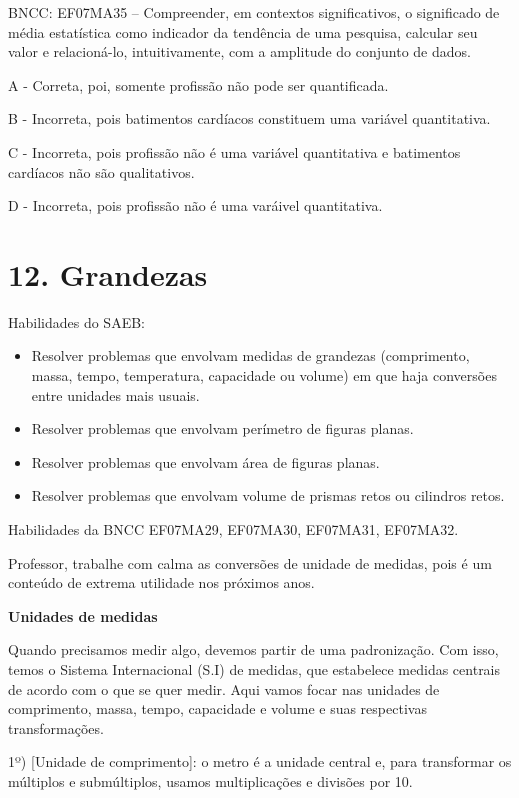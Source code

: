 BNCC: EF07MA35 -- Compreender, em contextos significativos, o
significado de média estatística como indicador da tendência de uma
pesquisa, calcular seu valor e relacioná-lo, intuitivamente, com a
amplitude do conjunto de dados.

A - Correta, poi, somente profissão não pode ser quantificada.

B - Incorreta, pois batimentos cardíacos constituem uma variável
quantitativa.

C - Incorreta, pois profissão não é uma variável quantitativa e
batimentos cardíacos não são qualitativos.

D - Incorreta, pois profissão não é uma varáivel quantitativa.

\hypertarget{grandezas}{%
\section{12. Grandezas}\label{grandezas}}

Habilidades do SAEB:

\begin{itemize}
\item
  Resolver problemas que envolvam medidas de grandezas (comprimento,
  massa, tempo, temperatura, capacidade ou volume) em que haja
  conversões entre unidades mais usuais.
\item
  Resolver problemas que envolvam perímetro de figuras planas.
\item
  Resolver problemas que envolvam área de figuras planas.
\item
  Resolver problemas que envolvam volume de prismas retos ou cilindros
  retos.
\end{itemize}

Habilidades da BNCC EF07MA29, EF07MA30, EF07MA31, EF07MA32.

Professor, trabalhe com calma as conversões de unidade de medidas, pois
é um conteúdo de extrema utilidade nos próximos anos.

\textbf{Unidades de medidas}

Quando precisamos medir algo, devemos partir de uma padronização. Com
isso, temos o Sistema Internacional (S.I) de medidas, que estabelece
medidas centrais de acordo com o que se quer medir. Aqui vamos focar nas
unidades de comprimento, massa, tempo, capacidade e volume e suas
respectivas transformações.

1º) {[}Unidade de comprimento{]}: o metro é a unidade central e, para
transformar os múltiplos e submúltiplos, usamos multiplicações e
divisões por 10.

